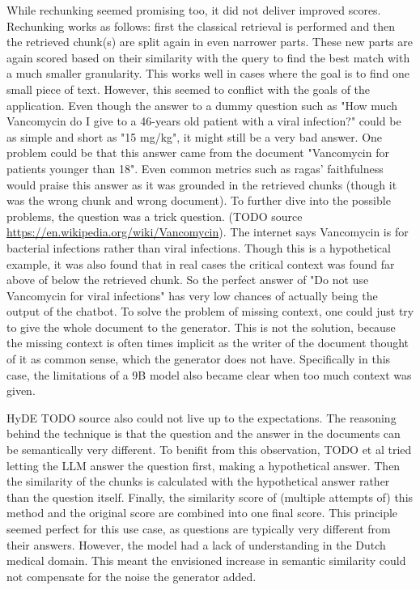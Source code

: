 While rechunking seemed promising too, it did not deliver improved scores. Rechunking works as follows: first the classical retrieval is performed and then the retrieved chunk(s) are split again in even narrower parts. These new parts are again scored based on their similarity with the query to find the best match with a much smaller granularity. This works well in cases where the goal is to find one small piece of text. However, this seemed to conflict with the goals of the application. Even though the answer to a dummy question such as "How much Vancomycin do I give to a 46-years old patient with a viral infection?" could be as simple and short as "15 mg/kg", it might still be a very bad answer. One problem could be that this answer came from the document "Vancomycin for patients younger than 18". Even common metrics such as ragas' faithfulness would praise this answer as it was grounded in the retrieved chunks (though it was the wrong chunk and wrong document). To further dive into the possible problems, the question was a trick question. (TODO source \url{https://en.wikipedia.org/wiki/Vancomycin}). The internet says Vancomycin is for bacterial infections rather than viral infections. Though this is a hypothetical example, it was also found that in real cases the critical context was found far above of below the retrieved chunk. So the perfect answer of "Do not use Vancomycin for viral infections" has very low chances of actually being the output of the chatbot. To solve the problem of missing context, one could just try to give the whole document to the generator. This is not the solution, because the missing context is often times implicit as the writer of the document thought of it as common sense, which the generator does not have. Specifically in this case, the limitations of a 9B model also became clear when too much context was given.

HyDE TODO source also could not live up to the expectations. The reasoning behind the technique is that the question and the answer in the documents can be semantically very different. To benifit from this observation, TODO et al tried letting the LLM answer the question first, making a hypothetical answer. Then the similarity of the chunks is calculated with the hypothetical answer rather than the question itself. Finally, the similarity score of (multiple attempts of) this method and the original score are combined into one final score. This principle seemed perfect for this use case, as questions are typically very different from their answers. However, the model had a lack of understanding in the Dutch medical domain. This meant the envisioned increase in semantic similarity could not compensate for the noise the generator added.

